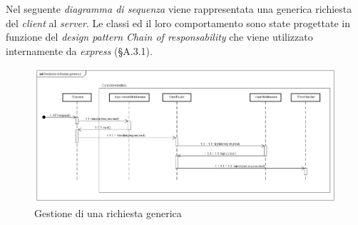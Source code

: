 Nel seguente \textit{diagramma di sequenza} viene rappresentata una generica richiesta del \textit{client} al \textit{server}. Le classi ed il loro comportamento sono state progettate in funzione del \textit{design pattern} \textit{Chain of responsability} che viene utilizzato internamente da \textit{express} (§A.3.1).

\label{Gestione richiesta generica}
\begin{figure}[ht]
	\centering
	\includegraphics[scale=0.39]{UML/DiagrammiDiSequenza/Back-end/GestioneRichiestaGenerica.png}
	\caption{Gestione di una richiesta generica}
\end{figure}
\FloatBarrier
